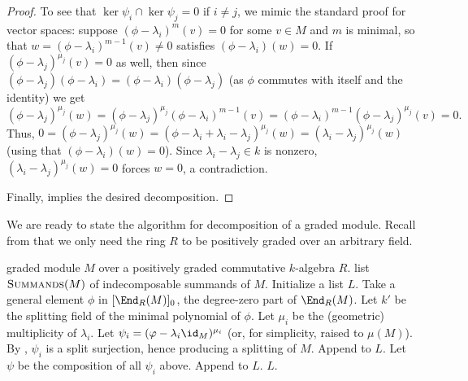 \documentclass[12pt]{amsart}
\theoremstyle{theorem}
\numberwithin{thm}{section}
\theoremstyle{definition}
\begin{document}
\begin{proof}
  To see that $\ker\psi_i\cap\ker\psi_j = 0$ if $i\neq j$, we mimic the standard proof for vector spaces: suppose $(\phi - \lambda_i)^m(v) = 0$ for some $v\in M$ and $m$ is minimal, so that $w = (\phi-\lambda_i)^{m-1}(v) \neq 0$ satisfies $(\phi-\lambda_i)(w) = 0$.
If $(\phi - \lambda_j)^{\mu_j}(v) = 0$ as well, then since $(\phi - \lambda_j)(\phi - \lambda_i) = (\phi - \lambda_i)(\phi - \lambda_j)$ (as $\phi$ commutes with itself and the identity) we get
  \[
  (\phi - \lambda_j)^{\mu_j}(w)
  = (\phi - \lambda_j)^{\mu_j}(\phi - \lambda_i)^{m-1}(v)
  = (\phi - \lambda_i)^{m-1}(\phi - \lambda_j)^{\mu_j}(v) = 0.
  \]
Thus,
  \(
  0 = (\phi - \lambda_j)^{\mu_j}(w) = (\phi - \lambda_i + \lambda_i - \lambda_j)^{\mu_j}(w) = (\lambda_i - \lambda_j)^{\mu_j}(w)
  \)
(using that $(\phi - \lambda_i)(w)=0$).
Since $\lambda_i-\lambda_j \in k$ is nonzero,
$(\lambda_i - \lambda_j)^{\mu_j}(w)= 0 $ forces $w=0$, a contradiction.

  Finally,  implies the desired decomposition.
\vadjust{\goodbreak}
\end{proof}

We are ready to state the algorithm for decomposition of a graded module. Recall from  that we only need the ring $R$ to be positively graded over an arbitrary field.

\begin{algorithm}[H]
  \caption{(Indecomposable summands of a graded module over a commutative ring)}\label{alg:graded}
  \begin{algorithmic}[1]
    \smallskip
    \Require graded module $M$ over a positively graded commutative $k$-algebra $R$.
    \Ensure  list $\textproc{Summands}(M)$ of indecomposable summands of $M$.
    \State Initialize a list $L$.
    \State Take a general element $\phi$ in $[\End_R(M)]_0$,
           the degree-zero part of $\End_R(M)$. \label{item:End0}
    \State Let $k'$ be the splitting field of the minimal polynomial of $\phi$.
      \State Let $\mu_i$ be the (geometric) multiplicity of $\lambda_i$.
      \State Let $\psi_i = (\phi - \lambda_i \id_M)^{\mu_i}$ (or, for simplicity, raised to $\mu(M)$).
      \State By , $\psi_i$ is a split surjection, hence producing a splitting of $M$.
      \State Append  to $L$.
    \EndFor
    \State Let $\psi$ be the composition of all $\psi_i$ above.
      \State Append  to $L$.
    \EndIf
    \State \Return $L$.
  \end{algorithmic}
\end{algorithm}
\end{document}
